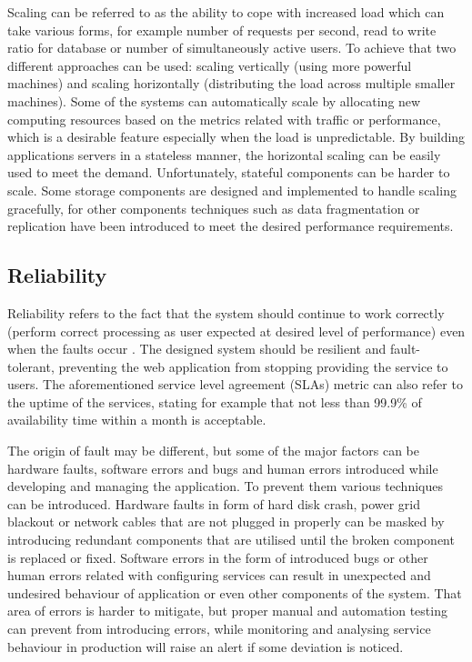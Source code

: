 Scaling can be referred to as the ability to cope with increased load which can take various forms, for example number of requests per second, read to write ratio for database or number of simultaneously active users. To achieve that two different approaches can be used: scaling vertically (using more powerful machines) and scaling horizontally (distributing the load across multiple smaller machines). Some of the systems can automatically scale by allocating new computing resources based on the metrics related with traffic or performance, which is a desirable feature especially when the load is unpredictable. By building applications servers in a stateless manner, the horizontal scaling can be easily used to meet the demand. Unfortunately, stateful components can be harder to scale. Some storage components are designed and implemented to handle scaling gracefully, for other components techniques such as data fragmentation or replication have been introduced to meet the desired performance requirements.

\subsection*{Reliability}

Reliability refers to the fact that the system should continue to work correctly (perform correct processing as user expected at desired level of performance) even when the faults occur \cite{DesignDataIntensiveApplications}. The designed system should be resilient and fault-tolerant, preventing the web application from stopping providing the service to users. The aforementioned service level agreement (SLAs) metric can also refer to the uptime of the services, stating for example that not less than 99.9\% of availability time within a month is acceptable.

The origin of fault may be different, but some of the major factors can be hardware faults, software errors and bugs and human errors introduced while developing and managing the application. To prevent them various techniques can be introduced. Hardware faults in form of hard disk crash, power grid blackout or network cables that are not plugged in properly can be masked by introducing redundant components that are utilised until the broken component is replaced or fixed. Software errors in the form of introduced bugs or other human errors related with configuring services can result in unexpected and undesired behaviour of application or even other components of the system. That area of errors is harder to mitigate, but proper manual and automation testing can prevent from introducing errors, while monitoring and analysing service behaviour in production will raise an alert if some deviation is noticed.

